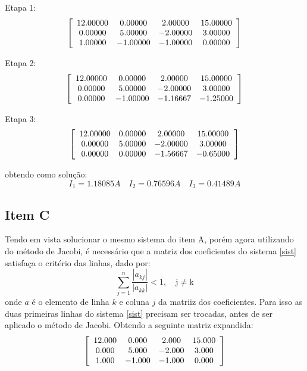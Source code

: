 \documentclass[a4paper,11pt, twoside]{article}
\begin{document}
    Etapa 1:
    \[
        \left [\begin{array}{c c c c}
                    12.00000    &   0.00000 &   2.00000 &   15.00000\\
                    0.00000 &   5.00000 &   -2.00000    &   3.00000\\
                    1.00000 &   -1.00000    &   -1.00000    &   0.00000\\
                \end{array} \right ]
    \]
    
    Etapa 2:
    \[
        \left [\begin{array}{c c c c}
                    12.00000    &   0.00000 &   2.00000 &   15.00000\\
                    0.00000 &   5.00000 &   -2.00000    &   3.00000\\
                    0.00000 &   -1.00000    &   -1.16667    &   -1.25000\\
                \end{array} \right ]
    \]
    
    Etapa 3:
        \[
        \left [\begin{array}{c c c c}
                    12.00000    &   0.00000 &   2.00000 &   15.00000\\
                    0.00000 &   5.00000 &   -2.00000    &   3.00000\\
                    0.00000 &   0.00000 &   -1.56667    &   -0.65000\\
                \end{array} \right ]
    \]
    
    obtendo como solução:
    \[
     I_1 =  1.18085A\quad I_2 = 0.76596A\quad I_3 = 0.41489A
    \]
    
    \subsection*{Item C}
    Tendo em vista solucionar o mesmo sistema do item A, porém agora utilizando do
    método de Jacobi, é necessário que a matriz dos coeficientes do sistema \eqref{sist}
    satisfaça o critério das linhas, dado por:
    \begin{equation}
        \sum^n_{j = 1} \frac{|a_{kj}|}{|a_{kk}|} < 1,\quad\mathrm{j \ne k}
    \end{equation}
    onde $a$ é o elemento de linha $k$ e coluna $j$ da matriiz dos coeficientes.
    Para isso as duas primeiras linhas do sistema \eqref{sist} precisam ser trocadas,
    antes de ser aplicado o método de Jacobi. Obtendo a seguinte matriz expandida:
    \begin{equation}\label{mat}
        \left [\begin{array}{c c c c}
                    12.000  &   0.000   &   2.000   &   15.000\\
                    0.000   &   5.000   &   -2.000  &   3.000\\
                    1.000   &   -1.000  &   -1.000  &   0.000
                \end{array} \right ]
    \end{equation}
    
\end{document}
